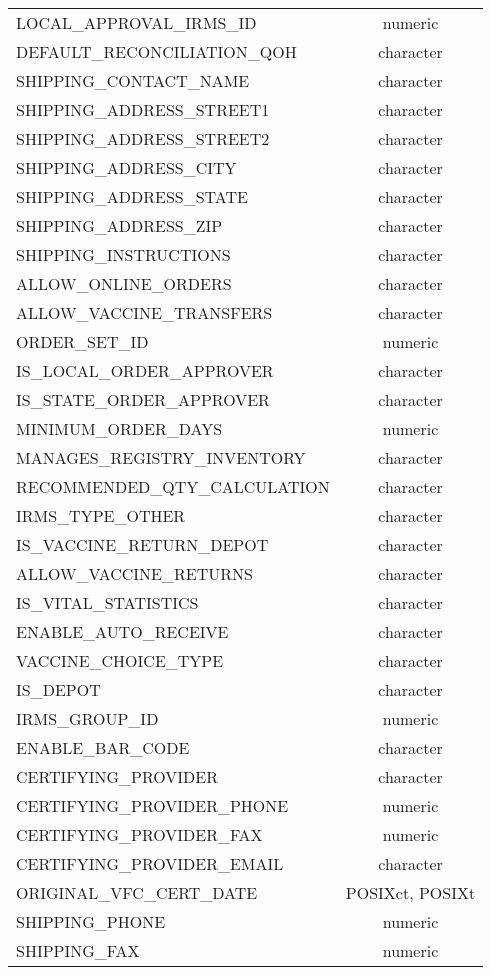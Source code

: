 \documentclass[
  letterpaper,
  DIV=11,
  numbers=noendperiod]{scrreprt}
\begin{document}
\begin{longtable}{lc}
LOCAL\_APPROVAL\_IRMS\_ID & numeric \\ 
DEFAULT\_RECONCILIATION\_QOH & character \\ 
SHIPPING\_CONTACT\_NAME & character \\ 
SHIPPING\_ADDRESS\_STREET1 & character \\ 
SHIPPING\_ADDRESS\_STREET2 & character \\ 
SHIPPING\_ADDRESS\_CITY & character \\ 
SHIPPING\_ADDRESS\_STATE & character \\ 
SHIPPING\_ADDRESS\_ZIP & character \\ 
SHIPPING\_INSTRUCTIONS & character \\ 
ALLOW\_ONLINE\_ORDERS & character \\ 
ALLOW\_VACCINE\_TRANSFERS & character \\ 
ORDER\_SET\_ID & numeric \\ 
IS\_LOCAL\_ORDER\_APPROVER & character \\ 
IS\_STATE\_ORDER\_APPROVER & character \\ 
MINIMUM\_ORDER\_DAYS & numeric \\ 
MANAGES\_REGISTRY\_INVENTORY & character \\ 
RECOMMENDED\_QTY\_CALCULATION & character \\ 
IRMS\_TYPE\_OTHER & character \\ 
IS\_VACCINE\_RETURN\_DEPOT & character \\ 
ALLOW\_VACCINE\_RETURNS & character \\ 
IS\_VITAL\_STATISTICS & character \\ 
ENABLE\_AUTO\_RECEIVE & character \\ 
VACCINE\_CHOICE\_TYPE & character \\ 
IS\_DEPOT & character \\ 
IRMS\_GROUP\_ID & numeric \\ 
ENABLE\_BAR\_CODE & character \\ 
CERTIFYING\_PROVIDER & character \\ 
CERTIFYING\_PROVIDER\_PHONE & numeric \\ 
CERTIFYING\_PROVIDER\_FAX & numeric \\ 
CERTIFYING\_PROVIDER\_EMAIL & character \\ 
ORIGINAL\_VFC\_CERT\_DATE & POSIXct, POSIXt \\ 
SHIPPING\_PHONE & numeric \\ 
SHIPPING\_FAX & numeric \\ 

\end{longtable}
\end{document}
